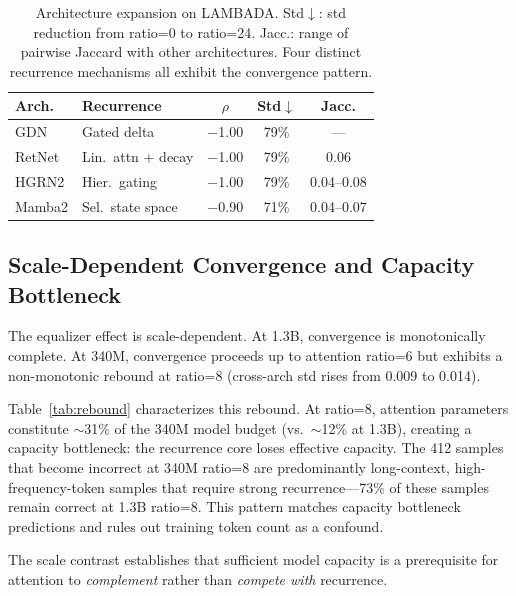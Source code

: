 \documentclass[11pt,twocolumn,a4paper]{article}
\begin{document}
\begin{table}[t]
\centering
\small
\begin{tabular}{llccc}
\toprule
\textbf{Arch.} & \textbf{Recurrence} & \textbf{$\rho$} & \textbf{Std$\downarrow$} & \textbf{Jacc.} \\
\midrule
GDN & Gated delta & $-$1.00 & 79\% & --- \\
RetNet & Lin.\ attn + decay & $-$1.00 & 79\% & 0.06 \\
HGRN2 & Hier.\ gating & $-$1.00 & 79\% & 0.04--0.08 \\
Mamba2 & Sel.\ state space & $-$0.90 & 71\% & 0.04--0.07 \\
\bottomrule
\end{tabular}
\caption{Architecture expansion on LAMBADA. Std$\downarrow$: std reduction from ratio=0 to ratio=24. Jacc.: range of pairwise Jaccard with other architectures. Four distinct recurrence mechanisms all exhibit the convergence pattern.}
\label{tab:expansion}
\end{table}

\subsection{Scale-Dependent Convergence and Capacity Bottleneck}
\label{sec:scale}

The equalizer effect is scale-dependent. At 1.3B, convergence is monotonically complete. At 340M, convergence proceeds up to attention ratio=6 but exhibits a non-monotonic rebound at ratio=8 (cross-arch std rises from 0.009 to 0.014).

Table~\ref{tab:rebound} characterizes this rebound. At ratio=8, attention parameters constitute $\sim$31\% of the 340M model budget (vs.\ $\sim$12\% at 1.3B), creating a capacity bottleneck: the recurrence core loses effective capacity. The 412 samples that become incorrect at 340M ratio=8 are predominantly long-context, high-frequency-token samples that require strong recurrence---73\% of these samples remain correct at 1.3B ratio=8. This pattern matches capacity bottleneck predictions and rules out training token count as a confound.

The scale contrast establishes that sufficient model capacity is a prerequisite for attention to \emph{complement} rather than \emph{compete with} recurrence.
\end{document}
